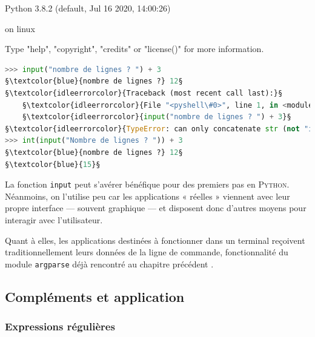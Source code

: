 \begin{idleshell*}
Python 3.8.2 (default, Jul 16 2020, 14:00:26)\par
[GCC 9.3.0] on linux\par
Type "help", "copyright", "credits" or "license()" for more information.\par
\begin{lstlisting}[style=idlestyle,language=python,escapeinside=§§]
>>> input("nombre de lignes ? ") + 3
§\textcolor{blue}{nombre de lignes ?} 12§
§\textcolor{idleerrorcolor}{Traceback (most recent call last):}§
	§\textcolor{idleerrorcolor}{File "<pyshell\#0>", line 1, in <module>}§
    §\textcolor{idleerrorcolor}{input("nombre de lignes ? ") + 3}§
§\textcolor{idleerrorcolor}{TypeError: can only concatenate str (not "int") to str}§
>>> int(input("Nombre de lignes ? ")) + 3
§\textcolor{blue}{nombre de lignes ?} 12§
§\textcolor{blue}{15}§
\end{lstlisting}
\end{idleshell*}

La fonction \texttt{input} peut s'avérer bénéfique pour des premiers pas en \textsc{Python}. Néanmoins, on l'utilise peu car les applications « réelles » viennent avec leur propre interface --- souvent graphique --- et disposent donc d'autres moyens pour interagir avec l'utilisateur.

Quant à elles, les applications destinées à fonctionner dans un terminal reçoivent traditionnellement leurs données de la ligne de commande, fonctionnalité du module \texttt{argparse} déjà rencontré au chapitre précédent .


\subsection[Compléments et application]{Compléments et application}
\label{sub:XI.1.2}


\subsubsection[Expressions régulières]{Expressions régulières}
\label{subsub:XI.1.2.1}

